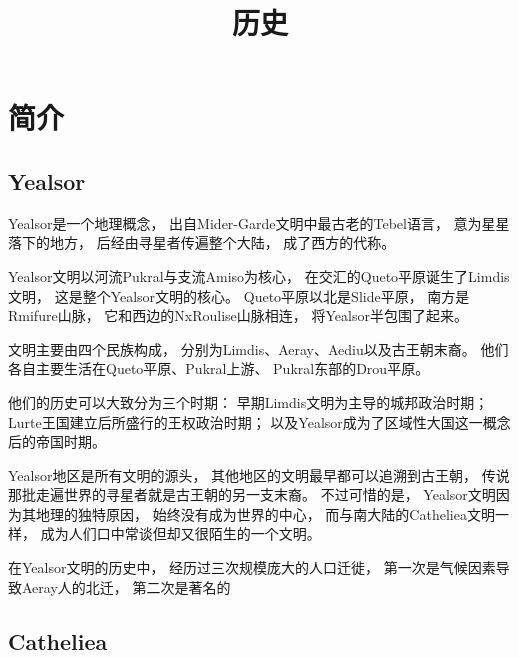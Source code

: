 \documentclass[UTF8,12pt,draft]{ctexbook}
\title{\textbf{历史}}
\author{}
\date{}
\begin{document}
\maketitle
\tableofcontents
    \chapter{简介}
            \section{Yealsor}
                Yealsor是一个地理概念，
                出自Mider-Garde文明中最古老的Tebel语言，
                意为星星落下的地方，
                后经由寻星者传遍整个大陆，
                成了西方的代称。

                Yealsor文明以河流Pukral与支流Amiso为核心，
                在交汇的Queto平原诞生了Limdis文明，
                这是整个Yealsor文明的核心。
                Queto平原以北是Slide平原，
                南方是Rmifure山脉，
                它和西边的NxRoulise山脉相连，
                将Yealsor半包围了起来。
                
                文明主要由四个民族构成，
                分别为Limdis、Aeray、Aediu以及古王朝末裔。
                他们各自主要生活在Queto平原、Pukral上游、
                Pukral东部的Drou平原。

                他们的历史可以大致分为三个时期：
                早期Limdis文明为主导的城邦政治时期；
                Lurte王国建立后所盛行的王权政治时期；
                以及Yealsor成为了区域性大国这一概念后的帝国时期。

                Yealsor地区是所有文明的源头，
                其他地区的文明最早都可以追溯到古王朝，
                传说那批走遍世界的寻星者就是古王朝的另一支末裔。
                不过可惜的是，
                Yealsor文明因为其地理的独特原因，
                始终没有成为世界的中心，
                而与南大陆的Catheliea文明一样，
                成为人们口中常谈但却又很陌生的一个文明。

                在Yealsor文明的历史中，
                经历过三次规模庞大的人口迁徙，
                第一次是气候因素导致Aeray人的北迁，
                第二次是著名的
                


                
            \section{Catheliea}
                        
\end{document}
